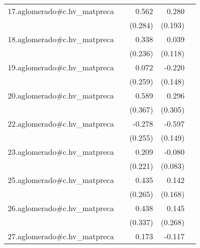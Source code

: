 {\begin{longtable}{l*{4}{D{.}{.}{-1}}}
\addlinespace
17.aglomerado#c.hv\_matpreca&                     &       0.562\sym{*}  &       0.280         &                     \\
            &                     &     (0.284)         &     (0.193)         &                     \\
\addlinespace
18.aglomerado#c.hv\_matpreca&                     &       0.338         &       0.039         &                     \\
            &                     &     (0.236)         &     (0.118)         &                     \\
\addlinespace
19.aglomerado#c.hv\_matpreca&                     &       0.072         &      -0.220         &                     \\
            &                     &     (0.259)         &     (0.148)         &                     \\
\addlinespace
20.aglomerado#c.hv\_matpreca&                     &       0.589         &       0.296         &                     \\
            &                     &     (0.367)         &     (0.305)         &                     \\
\addlinespace
22.aglomerado#c.hv\_matpreca&                     &      -0.278         &      -0.597\sym{***}&                     \\
            &                     &     (0.255)         &     (0.149)         &                     \\
\addlinespace
23.aglomerado#c.hv\_matpreca&                     &       0.209         &      -0.080         &                     \\
            &                     &     (0.221)         &     (0.083)         &                     \\
\addlinespace
25.aglomerado#c.hv\_matpreca&                     &       0.435         &       0.142         &                     \\
            &                     &     (0.265)         &     (0.168)         &                     \\
\addlinespace
26.aglomerado#c.hv\_matpreca&                     &       0.438         &       0.145         &                     \\
            &                     &     (0.337)         &     (0.268)         &                     \\
\addlinespace
27.aglomerado#c.hv\_matpreca&                     &       0.173         &      -0.117\sym{**} &                     \\

\end{longtable}}
